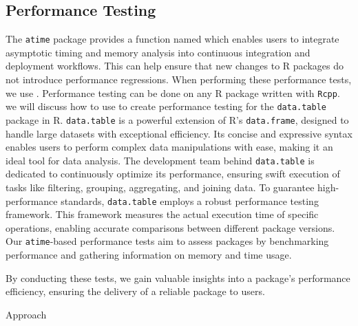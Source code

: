 \subsection{Performance Testing}
The \texttt{atime} package provides a function named  which enables users to integrate asymptotic timing and memory analysis into continuous integration and deployment workflows. 
This can help ensure that new changes to R packages do not introduce performance regressions. When performing these performance tests, we use .
Performance testing can be done on any R package written with \texttt{Rcpp}.\\


\noindent we will discuss how to use  to create performance testing for the \texttt{data.table} package in R.
\texttt{data.table} is a powerful extension of R's \texttt{data.frame}, designed to handle large datasets with exceptional efficiency. Its concise and expressive syntax enables users to perform complex data manipulations with ease, making it an ideal tool for data analysis. The development team behind \texttt{data.table} is dedicated to continuously optimize its performance, ensuring swift execution of tasks like filtering, grouping, aggregating, and joining data.
\vspace{0.1in}
To guarantee high-performance standards, \texttt{data.table} employs a robust performance testing framework. This framework measures the actual execution time of specific operations, enabling accurate comparisons between different package versions. 
Our \texttt{atime}-based performance tests aim to assess packages by benchmarking performance and gathering information on memory and time usage.

\vspace{0.1in}
By conducting these tests, we gain valuable insights into a package's performance efficiency, ensuring the delivery of a reliable package to users.
\vspace{0.1in}

\noindent Approach

